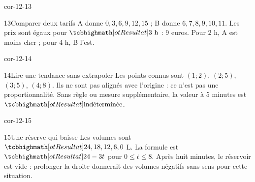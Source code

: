 \begin{blocLivre}{cor-12-13}\begin{corrige}{13}{Comparer deux tarifs}
A donne $0,3,6,9,12,15$ ; B donne $6,7,8,9,10,11$. Les prix sont égaux pour $\res{3\ \mathrm h}$ : 9 euros. Pour 2 h, A est moins cher ; pour 4 h, B l’est.
\label{fig-cor-12-13}
\end{corrige}\end{blocLivre}
\begin{blocLivre}{cor-12-14}\begin{corrige}{14}{Lire une tendance sans extrapoler}
Les points connus sont $(1;2)$, $(2;5)$, $(3;5)$, $(4;8)$. Ils ne sont pas alignés avec l’origine : ce n’est pas une proportionnalité. Sans règle ou mesure supplémentaire, la valeur à 5 minutes est $\res{\text{indéterminée}}$.
\label{fig-cor-12-14}
\end{corrige}\end{blocLivre}
\begin{blocLivre}{cor-12-15}\begin{corrige}{15}{Une réserve qui baisse}
Les volumes sont $\res{24,18,12,6,0}$ L. La formule est $\res{24-3t}$ pour $0\le t\le8$. Après huit minutes, le réservoir est vide : prolonger la droite donnerait des volumes négatifs sans sens pour cette situation.
\label{fig-cor-12-15}
\end{corrige}\end{blocLivre}

